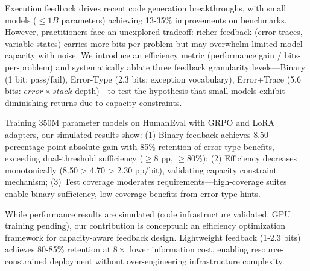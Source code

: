 
Execution feedback drives recent code generation breakthroughs, with small models ($\leq 1B$ parameters) achieving 13-35\% improvements on benchmarks. However, practitioners face an unexplored tradeoff: richer feedback (error traces, variable states) carries more bits-per-problem but may overwhelm limited model capacity with noise. We introduce an efficiency metric (performance gain / bits-per-problem) and systematically ablate three feedback granularity levels---Binary (1 bit: pass/fail), Error-Type (2.3 bits: exception vocabulary), Error+Trace (5.6 bits: $error\times stack$ depth)---to test the hypothesis that small models exhibit diminishing returns due to capacity constraints.

Training 350M parameter models on HumanEval with GRPO and LoRA adapters, our simulated results show: (1) Binary feedback achieves 8.50 percentage point absolute gain with 85\% retention of error-type benefits, exceeding dual-threshold sufficiency ($\geq 8$ pp, $\geq 80$\%); (2) Efficiency decreases monotonically (8.50 > 4.70 > 2.30 pp/bit), validating capacity constraint mechanism; (3) Test coverage moderates requirements---high-coverage suites enable binary sufficiency, low-coverage benefits from error-type hints.

While performance results are simulated (code infrastructure validated, GPU training pending), our contribution is conceptual: an efficiency optimization framework for capacity-aware feedback design. Lightweight feedback (1-2.3 bits) achieves 80-85\% retention at $8\times$ lower information cost, enabling resource-constrained deployment without over-engineering infrastructure complexity.
